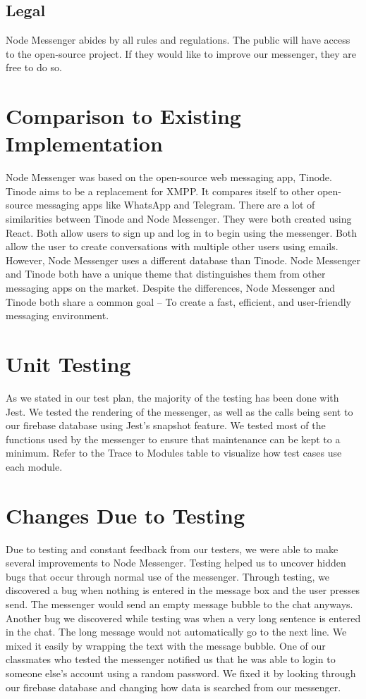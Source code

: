 \documentclass[12pt, titlepage]{article}
\begin{document}
	\subsection{Legal}
	Node Messenger abides by all rules and regulations. The public will have access to the open-source project. If they would like to improve our messenger, they are free to do so.  
	
\section{Comparison to Existing Implementation}	
Node Messenger was based on the open-source web messaging app, Tinode. Tinode aims to be a replacement for XMPP. It compares itself to other open-source messaging apps like WhatsApp and Telegram. There are a lot of similarities between Tinode and Node Messenger. They were both created using React. Both allow users to sign up and log in to begin using the messenger. Both allow the user to create conversations with multiple other users using emails. However, Node Messenger uses a different database than Tinode. Node Messenger and Tinode both have a unique theme that distinguishes them from other messaging apps on the market. Despite the differences, Node Messenger and Tinode both share a common goal – To create a fast, efficient, and user-friendly messaging environment.

\section{Unit Testing}
As we stated in our test plan, the majority of the testing has been done with Jest. We tested the rendering of the messenger, as well as the calls being sent to our firebase database using Jest’s snapshot feature. We tested most of the functions used by the messenger to ensure that maintenance can be kept to a minimum. Refer to the Trace to Modules table to visualize how test cases use each module.

\section{Changes Due to Testing}
Due to testing and constant feedback from our testers, we were able to make several improvements to Node Messenger. Testing helped us to uncover hidden bugs that occur through normal use of the messenger. Through testing, we discovered a bug when nothing is entered in the message box and the user presses send. The messenger would send an empty message bubble to the chat anyways. Another bug we discovered while testing was when a very long sentence is entered in the chat. The long message would not automatically go to the next line. We mixed it easily by wrapping the text with the message bubble. One of our classmates who tested the messenger notified us that he was able to login to someone else’s account using a random password. We fixed it by looking through our firebase database and changing how data is searched from our messenger. 
\end{document}
